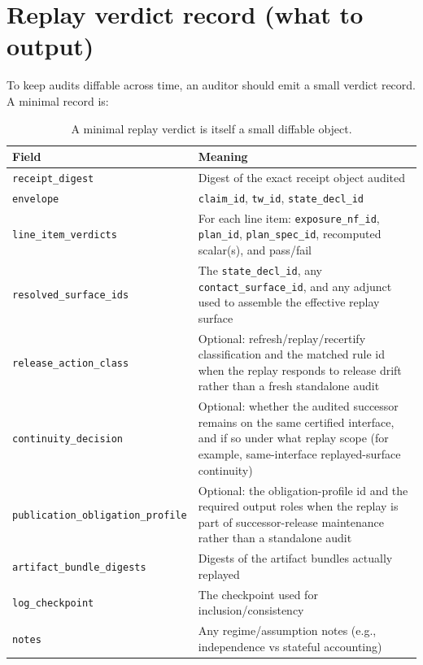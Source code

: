 \documentclass[11pt]{article}
\begin{document}
\section{Replay verdict record (what to output)}\label{sec:verdict}
To keep audits diffable across time, an auditor should emit a small verdict record.
A minimal record is:
\begin{table}[t]
\centering\small
\begin{tabularx}{\linewidth}{@{}lX@{}}
\toprule
Field & Meaning \\
\midrule
\texttt{receipt\_digest} & Digest of the exact receipt object audited \\
\texttt{envelope} & \texttt{claim\_id}, \texttt{tw\_id}, \texttt{state\_decl\_id} \\
\texttt{line\_item\_verdicts} & For each line item: \texttt{exposure\_nf\_id}, \texttt{plan\_id}, \texttt{plan\_spec\_id}, recomputed scalar(s), and pass/fail \\
\texttt{resolved\_surface\_ids} & The \texttt{state\_decl\_id}, any \texttt{contact\_surface\_id}, and any adjunct used to assemble the effective replay surface \\
\texttt{release\_action\_class} & Optional: refresh/replay/recertify classification and the matched rule id when the replay responds to release drift rather than a fresh standalone audit \\
\texttt{continuity\_decision} & Optional: whether the audited successor remains on the same certified interface, and if so under what replay scope (for example, same-interface replayed-surface continuity) \\
\texttt{publication\_obligation\_profile} & Optional: the obligation-profile id and the required output roles when the replay is part of successor-release maintenance rather than a standalone audit \\
\texttt{artifact\_bundle\_digests} & Digests of the artifact bundles actually replayed \\
\texttt{log\_checkpoint} & The checkpoint used for inclusion/consistency \\
\texttt{notes} & Any regime/assumption notes (e.g., independence vs stateful accounting) \\
\bottomrule
\end{tabularx}
\caption{A minimal replay verdict is itself a small diffable object.}
\end{table}
\end{document}
